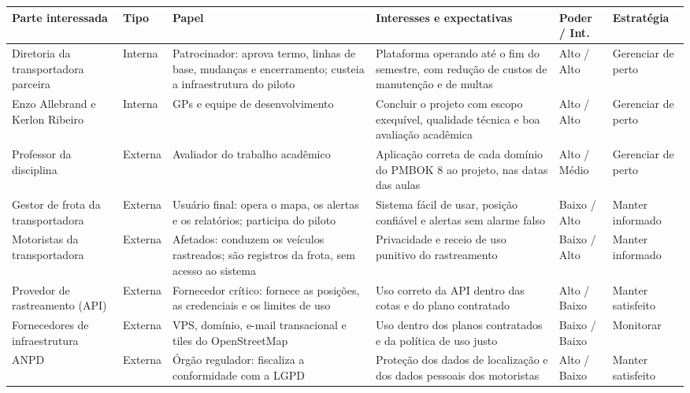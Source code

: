\documentclass[11pt,a4paper]{article}
\begin{document}
{\small
\begin{xltabular}{\textwidth}{>{\raggedright\arraybackslash}p{2.6cm} l L L l >{\raggedright\arraybackslash}p{1.9cm}}
\toprule
\textbf{Parte interessada} & \textbf{Tipo} & \textbf{Papel} & \textbf{Interesses e expectativas} & \textbf{Poder / Int.} & \textbf{Estratégia} \\
\midrule
\endhead
Diretoria da transportadora parceira & Interna & Patrocinador: aprova termo, linhas de base, mudanças e encerramento; custeia a infraestrutura do piloto & Plataforma operando até o fim do semestre, com redução de custos de manutenção e de multas & Alto / Alto & Gerenciar de perto \\
\addlinespace
Enzo Allebrand e Kerlon Ribeiro & Interna & GPs e equipe de desenvolvimento & Concluir o projeto com escopo exequível, qualidade técnica e boa avaliação acadêmica & Alto / Alto & Gerenciar de perto \\
\addlinespace
Professor da disciplina & Externa & Avaliador do trabalho acadêmico & Aplicação correta de cada domínio do PMBOK 8 ao projeto, nas datas das aulas & Alto / Médio & Gerenciar de perto \\
\addlinespace
Gestor de frota da transportadora & Externa & Usuário final: opera o mapa, os alertas e os relatórios; participa do piloto & Sistema fácil de usar, posição confiável e alertas sem alarme falso & Baixo / Alto & Manter informado \\
\addlinespace
Motoristas da transportadora & Externa & Afetados: conduzem os veículos rastreados; são registros da frota, sem acesso ao sistema & Privacidade e receio de uso punitivo do rastreamento & Baixo / Alto & Manter informado \\
\addlinespace
Provedor de rastreamento (API) & Externa & Fornecedor crítico: fornece as posições, as credenciais e os limites de uso & Uso correto da API dentro das cotas e do plano contratado & Alto / Baixo & Manter satisfeito \\
\addlinespace
Fornecedores de infraestrutura & Externa & VPS, domínio, e-mail transacional e tiles do OpenStreetMap & Uso dentro dos planos contratados e da política de uso justo & Baixo / Baixo & Monitorar \\
\addlinespace
ANPD & Externa & Órgão regulador: fiscaliza a conformidade com a LGPD & Proteção dos dados de localização e dos dados pessoais dos motoristas & Alto / Baixo & Manter satisfeito \\
\bottomrule
\end{xltabular}
}
\end{document}

